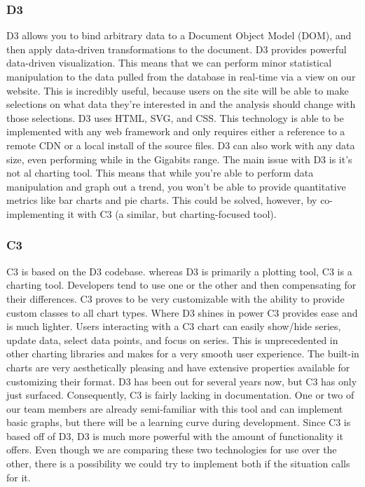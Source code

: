 \subsubsection{D3}
D3 allows you to bind arbitrary data to a Document Object Model (DOM), and then apply data-driven transformations to the document. 
D3 provides powerful data-driven visualization. 
This means that we can perform minor statistical manipulation to the data pulled from the database in real-time via a view on our website. 
This is incredibly useful, because users on the site will be able to make selections on what data they’re interested in and the analysis should change with those selections. 
D3 uses HTML, SVG, and CSS. 
This technology is able to be implemented with any web framework and only requires either a reference to a remote CDN or a local install of the source files. 
D3 can also work with any data size, even performing while in the Gigabits range.
The main issue with D3 is it’s not al charting tool. 
This means that while you’re able to perform data manipulation and graph out a trend, you won’t be able to provide quantitative metrics like bar charts and pie charts. 
This could be solved, however, by co-implementing it with C3 (a similar, but charting-focused tool).

\subsubsection{C3}
C3 is based on the D3 codebase. 
whereas D3 is primarily a plotting tool, C3 is a charting tool. 
Developers tend to use one or the other and then compensating for their differences. 
C3 proves to be very customizable with the ability to provide custom classes to all chart types. 
Where D3 shines in power C3 provides ease and is much lighter. 
Users interacting with a C3 chart can easily show/hide series, update data, select data points, and focus on series. 
This is unprecedented in other charting libraries and makes for a very smooth user experience. 
The built-in charts are very aesthetically pleasing and have extensive properties available for customizing their format.
D3 has been out for several years now, but C3 has only just surfaced. 
Consequently, C3 is fairly lacking in documentation. 
One or two of our team members are already semi-familiar with this tool and can implement basic graphs, but there will be a learning curve during development. 
Since C3 is based off of D3, D3 is much more powerful with the amount of functionality it offers. 
Even though we are comparing these two technologies for use over the other, there is a possibility we could try to implement both if the situation calls for it.

